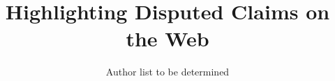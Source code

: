 \documentclass{www2010-submission}
\begin{document}
\toappear



\title{Highlighting Disputed Claims on the Web}



\author{
	Author list to be determined
}

%


\maketitle

\end{document}

